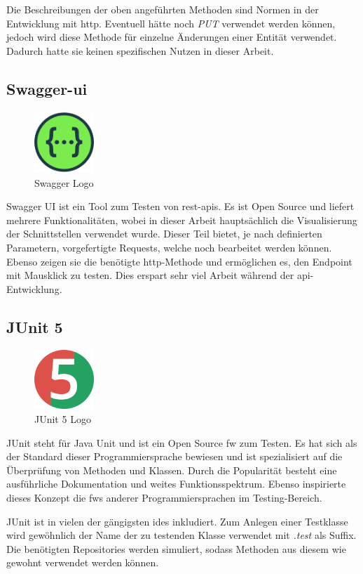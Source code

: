 Die Beschreibungen der oben angeführten Methoden sind Normen in der Entwicklung mit \gls{http}. 
Eventuell hätte noch \emph{PUT} verwendet werden können, jedoch wird diese Methode für einzelne Änderungen einer Entität verwendet.
Dadurch hatte sie keinen spezifischen Nutzen in dieser Arbeit. 
\cite{httpAbout}

\subsection{Swagger-ui}
\begin{figure}
    \begin{center}
        \includegraphics[width=0.2\textwidth]{pics/logos/swagger.png}
        \caption{Swagger Logo}
    \end{center}
\end{figure}
Swagger UI ist ein Tool zum Testen von \gls{rest}-\gls{api}s. 
Es ist Open Source und liefert mehrere Funktionalitäten, wobei in dieser Arbeit hauptsächlich die Visualisierung der Schnittstellen verwendet wurde. 
Dieser Teil bietet, je nach definierten Parametern, vorgefertigte Requests, welche noch bearbeitet werden können. 
Ebenso zeigen sie die benötigte \gls{http}-Methode und ermöglichen es, den Endpoint mit Mausklick zu testen. 
Dies erspart sehr viel Arbeit während der \gls{api}-Entwicklung.
\cite{SwaggeruiAbout}

\subsection{JUnit 5}
\begin{figure}
    \begin{center}
        \includegraphics[width=0.2\textwidth]{pics/logos/junit5-logo.png}
        \caption{JUnit 5 Logo}
    \end{center}
\end{figure}
JUnit steht für Java Unit und ist ein Open Source \gls{fw} zum Testen. 
Es hat sich als der Standard dieser Programmiersprache bewiesen und ist spezialisiert auf die Überprüfung von Methoden und Klassen.
Durch die Popularität besteht eine ausführliche Dokumentation und weites Funktionsspektrum.
Ebenso inspirierte dieses Konzept die \gls{fw}s anderer Programmiersprachen im Testing-Bereich.

JUnit ist in vielen der gängigsten \gls{ide}s inkludiert. 
Zum Anlegen einer Testklasse wird gewöhnlich der Name der zu testenden Klasse verwendet mit \emph{.test} als Suffix. 
Die benötigten Repositories werden simuliert, sodass Methoden aus diesem wie gewohnt verwendet werden können.
\cite{JUnitAbout}
